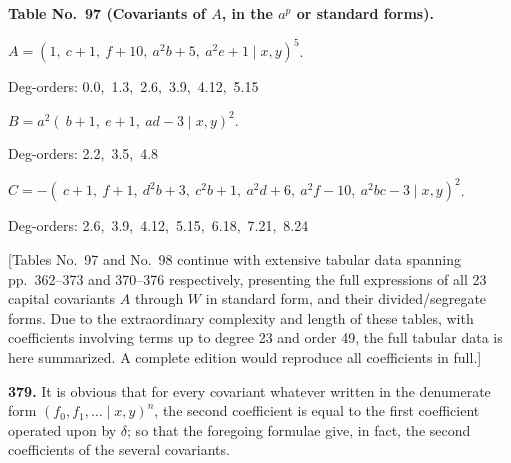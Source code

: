\documentclass[12pt,a4paper]{article}
\begin{document}
\medskip

\noindent\textbf{Table No.~97 (Covariants of $A$, in the $a^p$ or standard forms).}

\medskip

\noindent $A = (1,\ c+1,\ f+10,\ a^2 b+5,\ a^2 e+1 \mid x, y)^5$.
\begin{center}\small
Deg-orders: 0.0,\ 1.3,\ 2.6,\ 3.9,\ 4.12,\ 5.15
\end{center}

\noindent $B = a^2(\ b+1,\ e+1,\ ad-3 \mid x, y)^2$.
\begin{center}\small
Deg-orders: 2.2,\ 3.5,\ 4.8
\end{center}

\noindent $C = -(\ c+1,\ f+1,\ d^2 b+3,\ c^2 b+1,\ a^2 d+6,\ a^2 f-10,\ a^2 bc-3 \mid x, y)^2$.
\begin{center}\small
Deg-orders: 2.6,\ 3.9,\ 4.12,\ 5.15,\ 6.18,\ 7.21,\ 8.24
\end{center}

\medskip

[Tables No.~97 and No.~98 continue with extensive tabular data spanning pp.\ 362--373 and 370--376 respectively, presenting the full expressions of all 23 capital covariants $A$ through $W$ in standard form, and their divided/segregate forms. Due to the extraordinary complexity and length of these tables, with coefficients involving terms up to degree 23 and order 49, the full tabular data is here summarized. A complete edition would reproduce all coefficients in full.]

\medskip

\noindent\textbf{379.} It is obvious that for every covariant whatever written in the denumerate form $(f_0, f_1, \ldots \mid x, y)^n$, the second coefficient is equal to the first coefficient operated upon by $\delta$; so that the foregoing formulae give, in fact, the second coefficients of the several covariants.

\medskip
\end{document}
